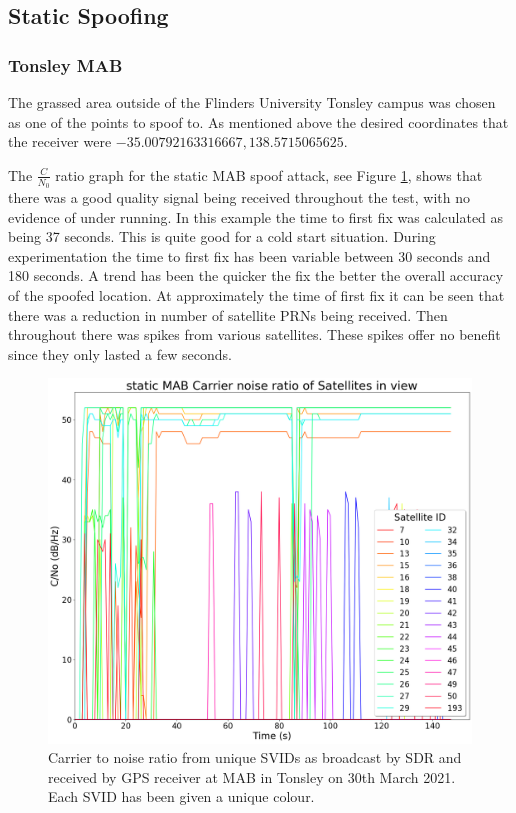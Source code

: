 \subsection{Static Spoofing}
\subsubsection{Tonsley MAB}
The grassed area outside of the Flinders University Tonsley campus was chosen as one of the points to spoof to. As mentioned above the desired coordinates that the receiver were
$-35.00792163316667, 138.5715065625$.

The $\frac{C}{N_0}$ ratio graph for the static MAB spoof attack, see Figure \ref{fig:MABStaticCNo}, shows that there was a good quality signal being received throughout
the test, with no evidence of under running. 
In this example the time to first fix was calculated as being 37 seconds. This is quite good for a cold start situation. During experimentation the time to first fix has
been variable between 30 seconds and 180 seconds. A trend has been the quicker the fix the better the overall accuracy of the spoofed location.
At approximately the time of first fix it can be seen that there was a reduction in number of satellite PRNs being received. Then throughout there was spikes from various
satellites. These spikes offer no benefit since they only lasted a few seconds. 

\begin{figure}[H]
    \begin{centering}
        \includegraphics[width=12cm,keepaspectratio]{Figures/2021_3_30_static_MAB Carrier noise ratio.png}
        \caption{Carrier to noise ratio from unique SVIDs as broadcast by SDR and received by GPS receiver at MAB in Tonsley on 30th March 2021. Each SVID has been given a unique colour.}
        \label{fig:MABStaticCNo}
    \end{centering}
\end{figure}

